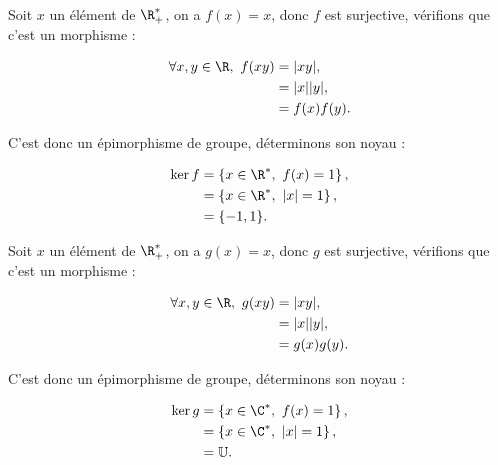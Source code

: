 Soit $x$ un élément de $\R^*_+$, on a $f(x)=x$, donc $f$ est surjective, vérifions que c'est un morphisme :

\begin{align*}
    \forall x,y \in \R,\ f(xy) &= |xy|, \\
    &= |x||y|, \\
    &= f(x)f(y).
\end{align*}

C'est donc un épimorphisme de groupe, déterminons son noyau :

\begin{align*}
    \ker f &= \left\{ x\in \R^*,\ f(x) = 1 \right\}, \\
           &= \left\{ x\in \R^*,\ |x| = 1 \right\}, \\
           &= \{-1, 1\}.
\end{align*}



Soit $x$ un élément de $\R^*_+$, on a $g(x)=x$, donc $g$ est surjective, vérifions que c'est un morphisme :

\begin{align*}
    \forall x,y \in \R,\ g(xy) &= |xy|, \\
    &= |x||y|, \\
    &= g(x)g(y).
\end{align*}

C'est donc un épimorphisme de groupe, déterminons son noyau :

\begin{align*}
    \ker g &= \left\{ x\in \C^*,\ f(x) = 1 \right\}, \\
           &= \left\{ x\in \C^*,\ |x| = 1 \right\}, \\
           &= \mathbb{U}.
\end{align*}